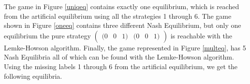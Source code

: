 The game in Figure \ref{uniqeq} contains exactly one equilibrium, which is
reached from the artificial equilibrium using all the strategies 1 through
6. The game shown in Figure \ref{oneeq} contains three different Nash
Equilibrium, but only one equilibrium the pure strategy 
$
\begin{pmatrix}
    (0 & 0 & 1) &(0 & 0 & 1)
\end{pmatrix}
$
is reachable with the Lemke-Howson algorithm. Finally, the game represented
in Figure \ref{multeq}, has 5 Nash Equilibria all of which can be found
with the Lemke-Howson algorithm. Using the missing labels 1 through 6 from
the artificial equilibrium, we get the following equilibria.
